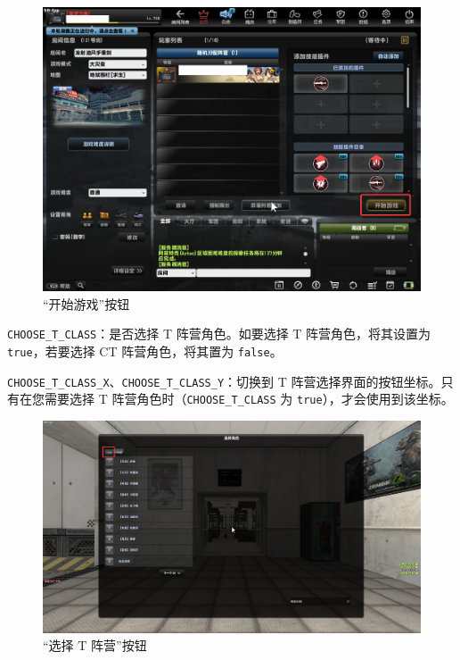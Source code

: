 \begin{figure}[H]
    \Centering
    \includegraphics[width=\textwidth]{docs/assets/start_game.png}
    \caption{“开始游戏”按钮}
\end{figure}

\lstinline{CHOOSE_T_CLASS}：是否选择 T 阵营角色。如要选择 T 阵营角色，将其设置为 \lstinline{true}，若要选择 CT 阵营角色，将其置为 \lstinline{false}。

\lstinline{CHOOSE_T_CLASS_X}、\lstinline{CHOOSE_T_CLASS_Y}：切换到 T 阵营选择界面的按钮坐标。只有在您需要选择 T 阵营角色时（\lstinline{CHOOSE_T_CLASS} 为 \lstinline{true}），才会使用到该坐标。

\begin{figure}[H]
    \Centering
    \includegraphics[width=\textwidth]{docs/assets/choose_T_class.png}
    \caption{“选择 T 阵营”按钮}
\end{figure}

